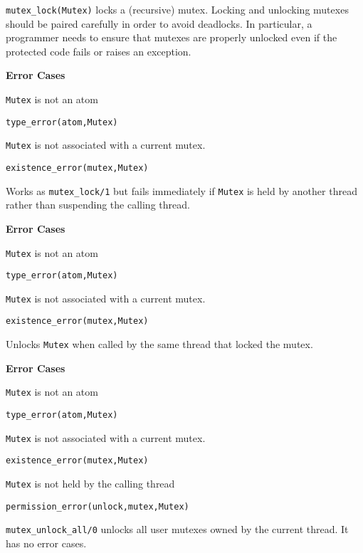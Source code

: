 \begin{description}
%
{\tt mutex\_lock(Mutex)} locks a (recursive) mutex. Locking and
unlocking mutexes should be paired carefully in order to avoid
deadlocks. In particular, a programmer needs to ensure that mutexes
are properly unlocked even if the protected code fails or raises an
exception.

{\bf Error Cases}
\bi
\item 	{\tt Mutex} is not an atom
\bi
\item 	{\tt type\_error(atom,Mutex)}
\ei
\item 	{\tt Mutex} is not associated with a current mutex.
\bi
\item 	{\tt existence\_error(mutex,Mutex)}
\ei
\ei

%
Works as {\tt mutex\_lock/1} but fails immediately if {\tt Mutex} is
held by another thread rather than suspending the calling thread.

{\bf Error Cases}
\bi
\item 	{\tt Mutex} is not an atom
\bi
\item 	{\tt type\_error(atom,Mutex)}
\ei
\item 	{\tt Mutex} is not associated with a current mutex.
\bi
\item 	{\tt existence\_error(mutex,Mutex)}
\ei
\ei

%
Unlocks {\tt Mutex} when called by the same thread that locked the mutex.

{\bf Error Cases}
\bi
\item 	{\tt Mutex} is not an atom
\bi
\item 	{\tt type\_error(atom,Mutex)}
\ei
\item 	{\tt Mutex} is not associated with a current mutex.
\bi
\item 	{\tt existence\_error(mutex,Mutex)}
\ei
\item 	{\tt Mutex} is not held by the calling thread
\bi
\item 	{\tt permission\_error(unlock,mutex,Mutex)}
\ei
\ei

%
{\tt mutex\_unlock\_all/0} unlocks all user mutexes owned by the
current thread.  It has no error cases.


\end{description}
